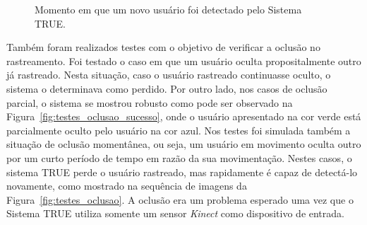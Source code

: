 	\begin{figure}[htb]
		\begin{center}
		\end{center}
		\caption{Momento em que um novo usuário foi detectado pelo Sistema TRUE.}
		\label{fig:testes_deteccao}
	\end{figure}
		
	Também foram realizados testes com o objetivo de verificar a oclusão no
	rastreamento. Foi testado o caso em que um usuário oculta propositalmente outro
	já rastreado. Nesta situação, caso o usuário rastreado continuasse oculto, o
	sistema o determinava como perdido. Por outro lado, nos casos de oclusão
	parcial, o sistema se mostrou robusto como pode ser observado na
	Figura~\ref{fig:testes_oclusao_sucesso}, onde o usuário apresentado na cor verde
	está parcialmente oculto pelo usuário na cor azul. Nos testes foi simulada
	também a situação de oclusão momentânea, ou seja, um usuário em movimento oculta
	outro por um curto período de tempo em razão da sua movimentação. Nestes casos,
	o sistema TRUE perde o usuário rastreado, mas rapidamente é capaz de detectá-lo
	novamente, como mostrado na sequência de imagens da
	Figura~\ref{fig:testes_oclusao}. A oclusão era um problema esperado uma vez que
	o Sistema TRUE utiliza somente um sensor \textit{Kinect} como dispositivo de
	entrada.
			
